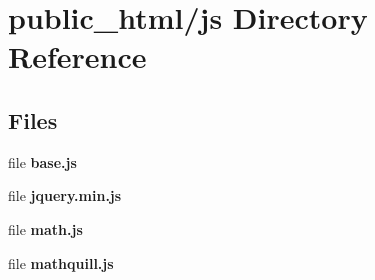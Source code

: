 \section{public\-\_\-html/js Directory Reference}
\label{dir_2b4b3000913c27c8ce939d4514539390}
\subsection*{Files}
\begin{DoxyCompactItemize}
\item 
file {\bf base.\-js}
\item 
file {\bf jquery.\-min.\-js}
\item 
file {\bf math.\-js}
\item 
file {\bf mathquill.\-js}
\end{DoxyCompactItemize}
